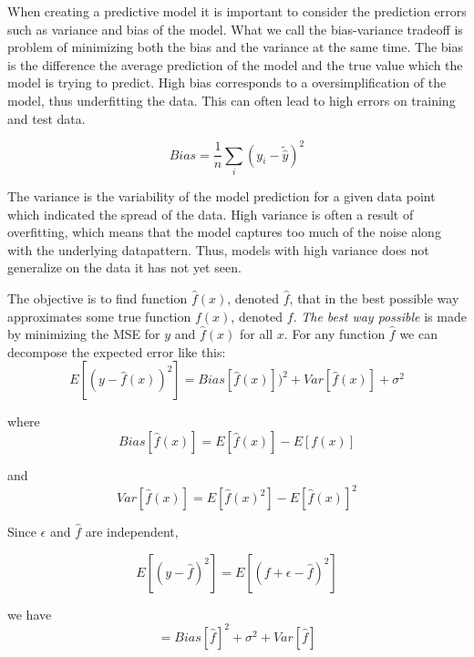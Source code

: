 \documentclass[a4paper,11pt,twocolumn]{article}
\begin{document}
When creating a predictive model it is important to consider the prediction errors such as variance and bias of the model. What we call the bias-variance tradeoff is problem of minimizing both the bias and the variance at the same time. The bias is the difference the average prediction of the model and the true value which the model is trying to predict. High bias corresponds to a oversimplification of the model, thus underfitting the data. This can often lead to high errors on training and test data. 

\begin{equation}
Bias=\frac{1}{n}\sum\limits_{i}^{}(y_i-\tilde{\hat{y}})^2
\end{equation}
  
The variance is the variability of the model prediction for a given data point which indicated the spread of the data. High variance is often a result of overfitting, which means that the model captures too much of the noise along with the underlying datapattern. Thus, models with high variance does not generalize on the data it has not yet seen. 

The objective is to find  function $\hat{f}(x)$, denoted $\hat{f}$, that in the best possible way approximates some true function $f(x)$, denoted $f$. \textit{The best way possible} is made by minimizing the MSE for $y$ and $\hat{f}(x)$ for all $x$.\cite{wiki} 
For any function $\hat{f}$ we can decompose the expected error like this:
\begin{equation}
E[(y-\hat{f}(x))^2]=Bias[\hat{f}(x)])^2+Var[\hat{f}(x)]+\sigma^2
\end{equation}

where 
\begin{equation}
Bias[\hat{f}(x)]=E[\hat{f}(x)]-E[f(x)]
\end{equation}

and 
\begin{equation}
Var[\hat{f}(x)]=E[\hat{f}(x)^2] - E[\hat{f}(x)]^2
\end{equation}

Since $\epsilon$ and $\hat{f}$ are independent,

\begin{equation}
E[(y-\hat{f})^2]=E[(f+\epsilon-\hat{f})^2]
\end{equation}

we have
\begin{equation}
\label{b1}
=Bias[\hat{f}]^2+\sigma^2+Var[\hat{f}]
\end{equation}
\end{document}
